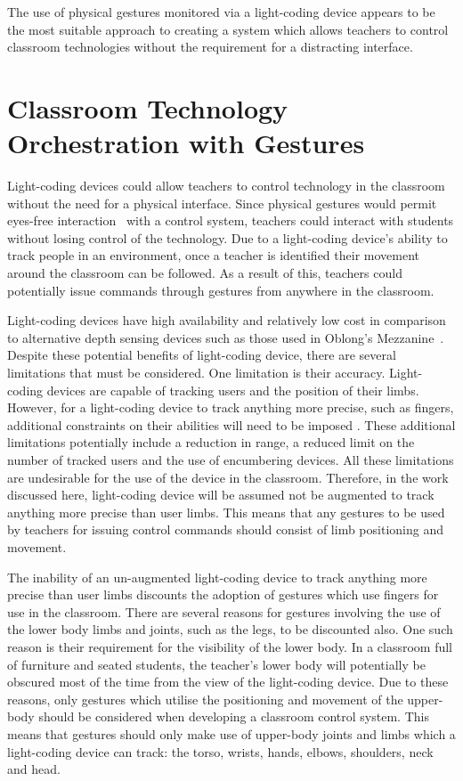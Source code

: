 \documentclass[link]{IWCOMP}
\begin{document}
The use of physical gestures monitored via a light-coding device appears to be the most suitable approach to creating a system which allows teachers to control classroom technologies without the requirement for a distracting interface.

\section{Classroom Technology Orchestration with Gestures} 
\label{sec:orchestration}

Light-coding devices could allow teachers to control technology in the classroom without the need for a physical interface.
Since physical gestures would permit eyes-free interaction~\cite{Brewster2003} with a control system, teachers could interact with students without losing control of the technology.
Due to a light-coding device's ability to track people in an environment, once a teacher is identified their movement around the classroom can be followed.
As a result of this, teachers could potentially issue commands through gestures from anywhere in the classroom.

Light-coding devices have high availability and relatively low cost in comparison to alternative depth sensing devices such as those used in Oblong's Mezzanine~\cite{kramer2011}.
Despite these potential benefits of light-coding device, there are several limitations that must be considered.
One limitation is their accuracy.
Light-coding devices are capable of tracking users and the position of their limbs.
However, for a light-coding device to track anything more precise, such as fingers, additional constraints on their abilities will need to be imposed \cite{Clark2011}.
These additional limitations potentially include a reduction in range, a reduced limit on the number of tracked users and the use of encumbering devices.
All these limitations are undesirable for the use of the device in the classroom.
Therefore, in the work discussed here, light-coding device will be assumed not be augmented to track anything more precise than user limbs.
This means that any gestures to be used by teachers for issuing control commands should consist of limb positioning and movement.

The inability of an un-augmented light-coding device to track anything more precise than user limbs discounts the adoption of gestures which use fingers for use in the classroom.
There are several reasons for gestures involving the use of the lower body limbs and joints, such as the legs, to be discounted also.
One such reason is their requirement for the visibility of the lower body.
In a classroom full of furniture and seated students, the teacher's lower body will potentially be obscured most of the time from the view of the light-coding device.
Due to these reasons, only gestures which utilise the positioning and movement of the upper-body should be considered when developing a classroom control system.
This means that gestures should only make use of upper-body joints and limbs which a light-coding device can track: the torso, wrists, hands, elbows, shoulders, neck and head.
\end{document}
